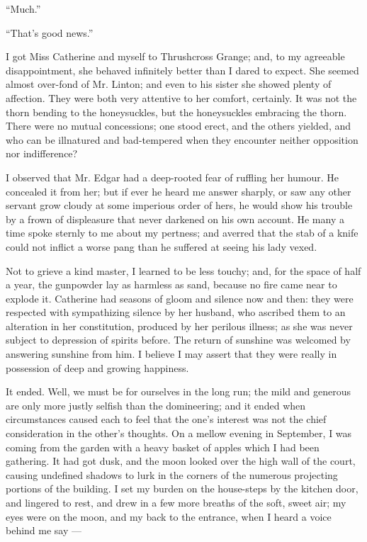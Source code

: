 \par “Much.”
\par “That's good news.”
\par 
\par I got Miss Catherine and myself to Thrushcross Grange; and, to my agreeable disappointment, she behaved infinitely better than I dared to expect. She seemed almost over-fond of Mr. Linton; and even to his sister she showed plenty of affection. They were both very attentive to her comfort, certainly. It was not the thorn bending to the honeysuckles, but the honeysuckles embracing the thorn. There were no mutual concessions; one stood erect, and the others yielded, and who can be illnatured and bad-tempered when they encounter neither opposition nor indifference?
\par I observed that Mr. Edgar had a deep-rooted fear of ruffling her humour. He concealed it from her; but if ever he heard me answer sharply, or saw any other servant grow cloudy at some imperious order of hers, he would show his trouble by a frown of displeasure that never darkened on his own account. He many a time spoke sternly to me about my pertness; and averred that the stab of a knife could not inflict a worse pang than he suffered at seeing his lady vexed.
\par Not to grieve a kind master, I learned to be less touchy; and, for the space of half a year, the gunpowder lay as harmless as sand, because no fire came near to explode it. Catherine had seasons of gloom and silence now and then: they were respected with sympathizing silence by her husband, who ascribed them to an alteration in her constitution, produced by her perilous illness; as she was never subject to depression of spirits before. The return of sunshine was welcomed by answering sunshine from him. I believe I may assert that they were really in possession of deep and growing happiness.
\par It ended. Well, we must be for ourselves in the long run; the mild and generous are only more justly selfish than the domineering; and it ended when circumstances caused each to feel that the one's interest was not the chief consideration in the other's thoughts. On a mellow evening in September, I was coming from the garden with a heavy basket of apples which I had been gathering. It had got dusk, and the moon looked over the high wall of the court, causing undefined shadows to lurk in the corners of the numerous projecting portions of the building. I set my burden on the house-steps by the kitchen door, and lingered to rest, and drew in a few more breaths of the soft, sweet air; my eyes were on the moon, and my back to the entrance, when I heard a voice behind me say —
